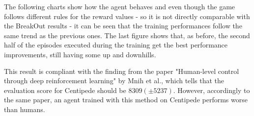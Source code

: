 \documentclass[12pt]{article}
\begin{document}

The following charts show how the agent behaves and even though the game follows different rules for the reward values - so it is not directly comparable with the BreakOut results - it can be seen that the training performances follow the same trend as the previous ones. The last figure shows that, as before, the second half of the episodes executed during the training get the best performance improvements, still having some up and downhills. 

This result is compliant with the finding from the paper "Human-level control through deep reinforcement learning" by Mnih et al., which tells that the evaluation score for Centipede should be $8309 (\pm 5237)$. However, accordingly to the same paper, an agent trained with this method on Centipede performs worse than humans.
\end{document}
